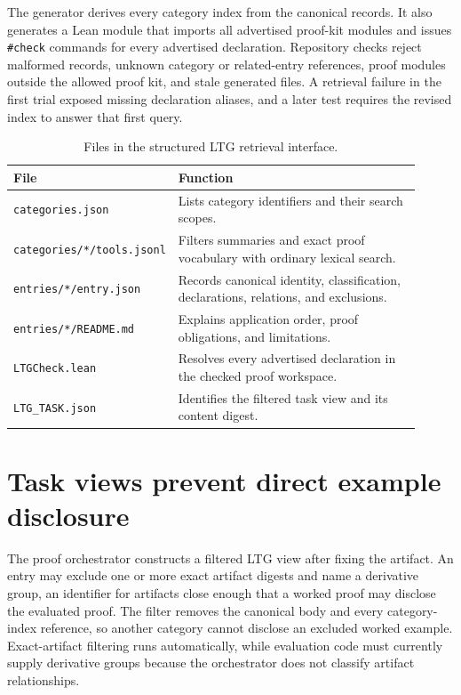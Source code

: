 \documentclass[10pt]{article}
\begin{document}
The generator derives every category index from the canonical records.  It also generates a Lean module that imports all advertised proof-kit modules and issues \texttt{\#check} commands for every advertised declaration.  Repository checks reject malformed records, unknown category or related-entry references, proof modules outside the allowed proof kit, and stale generated files.  A retrieval failure in the first trial exposed missing declaration aliases, and a later test requires the revised index to answer that first query.

\begin{table}[t]
\centering
\small
\begin{tabular}{>{\raggedright\arraybackslash}p{0.27\linewidth} p{0.64\linewidth}}
\toprule
File & Function \\
\midrule
\texttt{categories.json} & Lists category identifiers and their search scopes. \\
\texttt{categories/*/tools.jsonl} & Filters summaries and exact proof vocabulary with ordinary lexical search. \\
\texttt{entries/*/entry.json} & Records canonical identity, classification, declarations, relations, and exclusions. \\
\texttt{entries/*/README.md} & Explains application order, proof obligations, and limitations. \\
\texttt{LTGCheck.lean} & Resolves every advertised declaration in the checked proof workspace. \\
\texttt{LTG\_TASK.json} & Identifies the filtered task view and its content digest. \\
\bottomrule
\end{tabular}
\caption{Files in the structured LTG retrieval interface.}
\label{tab:files}
\end{table}

\section{Task views prevent direct example disclosure}

The proof orchestrator constructs a filtered LTG view after fixing the artifact.  An entry may exclude one or more exact artifact digests and name a derivative group, an identifier for artifacts close enough that a worked proof may disclose the evaluated proof.  The filter removes the canonical body and every category-index reference, so another category cannot disclose an excluded worked example.  Exact-artifact filtering runs automatically, while evaluation code must currently supply derivative groups because the orchestrator does not classify artifact relationships.
\end{document}
